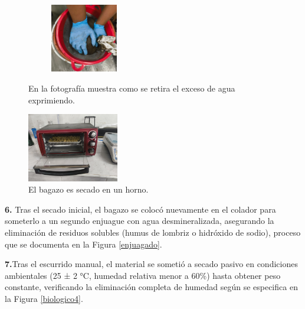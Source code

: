 \documentclass[12pt]{article}
\begin{document}
	
	

	
		\begin{figure}[H]
		\centering
		\begin{minipage}{0.46\textwidth}
			\centering
			\includegraphics[width=5cm, height=3cm]{imagenes/biologico3} %
			\caption{En la fotografía muestra como se retira el exceso de agua exprimiendo.}
			\label{biologico3}
		\end{minipage}
		\hfill
		\begin{minipage}{0.48\textwidth}
			\centering
			\includegraphics[width=4cm, height=3cm]{imagenes/secado2} %
			\caption{El bagazo es secado en un horno.}
			\label{secado2}
		\end{minipage}
	\end{figure}
	
	
	
		\textbf{6.} Tras el secado inicial, el bagazo se colocó nuevamente en el colador para someterlo a un segundo enjuague con agua desmineralizada, asegurando la eliminación de residuos solubles (humus de lombriz o hidróxido de sodio), proceso que se documenta en la Figura \ref{enjuagado}.
		
	
		
	  \textbf{7.}Tras el escurrido manual, el material se sometió a secado pasivo en condiciones ambientales (25 ± 2 °C, humedad relativa menor a 60\%) hasta obtener peso constante, verificando la eliminación completa de humedad según se especifica en la Figura \ref{biologico4}.
	
\end{document}
